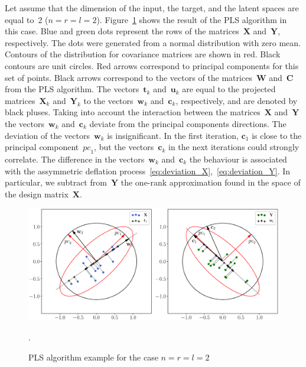 \documentclass[12pt,twoside]{article}
\theoremstyle{definition}
\newcommand{\bw}{\mathbf{w}}
\newcommand{\bY}{\mathbf{Y}}
\newcommand{\bX}{\mathbf{X}}
\newcommand{\bu}{\mathbf{u}}
\newcommand{\bt}{\mathbf{t}}
\newcommand{\bc}{\mathbf{c}}
\newcommand{\bC}{\mathbf{C}}
\newcommand{\bW}{\mathbf{W}}
\begin{document}
Let assume that the dimension of the input, the target, and the latent spaces are equal to~2 ($n = r = l = 2$).
Figure~\ref{fig:PLSFigure} shows the result of the PLS algorithm in this case.
Blue and green dots represent the rows of the matrices~$\bX$ and~$\bY$, respectively. 
The dots were generated from a normal distribution with zero mean. 
Contours of the distribution for covariance matrices are shown in red.
Black contours are unit circles. 
Red arrows correspond to principal components for this set of points. 
Black arrows correspond to the vectors of the matrices~$\bW$ and~$\bC$ from the PLS algorithm. 
The vectors~$\bt_k$ and~$\bu_k$ are equal to the projected matrices~$\bX_k$ and~$\bY_k$ to the vectors~$\bw_k$ and~$\bc_k$, respectively, and are denoted by black pluses. 
Taking into account the interaction between the matrices~$\bX$ and~$\bY$ the vectors~$\bw_k$ and~$\bc_k$ deviate from the principal components directions. 
The deviation of the vectors~$\bw_k$ is insignificant. 
In the first iteration, $\bc_1$ is close to the principal component~$\textit{pc}_1$, but the vectors~$\bc_k$ in the next iterations could strongly correlate. 
The difference in the vectors~$\bw_k$ and~$\bc_k$ the behaviour is associated with the assymmetric deflation process~\eqref{eq:deviation_X},~\eqref{eq:deviation_Y}. In particular, we subtract from~$\bY$ the one-rank approximation found in the space of the design matrix~$\bX$.
\begin{figure}[h]
	\centering
	\includegraphics[width=\linewidth]{figs/PLSFigure.eps}
	\caption{PLS algorithm example for the case $n = r = l = 2$}.
	\label{fig:PLSFigure}
\end{figure}
\end{document}
